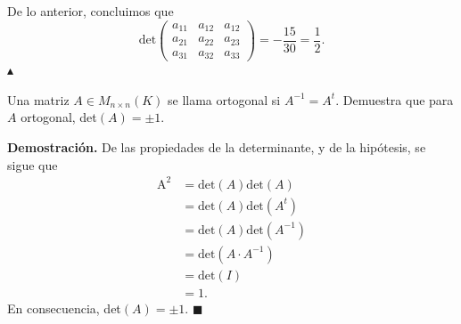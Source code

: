 \documentclass[11pt]{scrartcl}
\begin{document}
De lo anterior, concluimos que
\begin{equation*}
    \text{det}
    \begin{pmatrix}
        a_{11} & a_{12} & a_{12} \\
        a_{21} & a_{22} & a_{23} \\
        a_{31} & a_{32} & a_{33}
    \end{pmatrix}
    =-\frac{15}{30}
    =\frac{1}{2}.
\end{equation*}
\hfill $\blacktriangle$

\begin{mdframed}[style=mdpurplebox, frametitle={Ejercicio 2, Tarea 01, Álgebra Lineal II}]
    Una matriz  $A \in M_{n\times n}(K)$ se llama ortogonal si $A^{-1}=A^t$. Demuestra que para $A$
    ortogonal, det$(A)=\pm 1$.
\end{mdframed}
\textbf{Demostración.} De las propiedades de la determinante, y de la hipótesis, se sigue que
\begin{align*}
    \text{A}^2 &= \text{det}\left(A\right)\text{det}\left(A\right) \\
    &= \text{det}\left(A\right)\text{det}\left(A^t\right) \\
    &= \text{det}\left(A\right)\text{det}\left(A^{-1}\right) \\
    &= \text{det}\left(A\cdot A^{-1}\right) \\
    &= \text{det}\left(I\right) \\
    &= 1.
\end{align*}
En consecuencia, det$\left(A\right)=\pm 1$. \hfill $\blacksquare$
\end{document}
